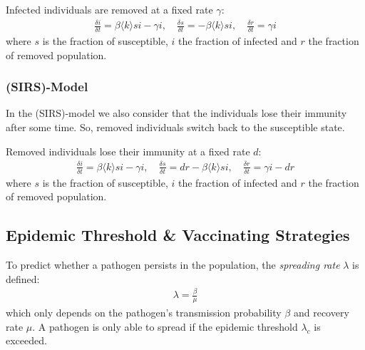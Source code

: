\documentclass[english]{panikzettel}
\begin{document}
Infected individuals are removed at a fixed rate $ \gamma $:
\begin{align*}
	\frac{\delta i}{\delta t} = \beta \langle k \rangle si - \gamma i, \quad
	\frac{\delta s}{\delta t} = - \beta \langle k \rangle si, \quad 
	\frac{\delta r}{\delta t} = \gamma i
\end{align*}
where $ s $ is the fraction of susceptible, $ i $ the fraction of infected and $ r $ the fraction of removed population.

\subsubsection{(SIRS)-Model}
In the (SIRS)-model we also consider that the individuals lose their immunity after some time.
So, removed individuals switch back to the susceptible state.

\begin{figure}[ht!]
	\centering
\end{figure}

Removed individuals lose their immunity at a fixed rate $ d $:
\begin{align*}
	\frac{\delta i}{\delta t} = \beta \langle k \rangle si - \gamma i, \quad
	\frac{\delta s}{\delta t} = dr - \beta \langle k \rangle si, \quad 
	\frac{\delta r}{\delta t} = \gamma i - dr
\end{align*}
where $ s $ is the fraction of susceptible, $ i $ the fraction of infected and $ r $ the fraction of removed population.

\subsection{Epidemic Threshold \& Vaccinating Strategies}
To predict whether a pathogen persists in the population, the \textit{spreading rate} $ \lambda $ is defined:
\begin{align*}
	\lambda = \frac{\beta}{\mu}
\end{align*}
which only depends on the pathogen's transmission probability $ \beta $ and recovery rate $ \mu $.
A pathogen is only able to spread if the epidemic threshold $ \lambda_c $ is exceeded.
\end{document}
